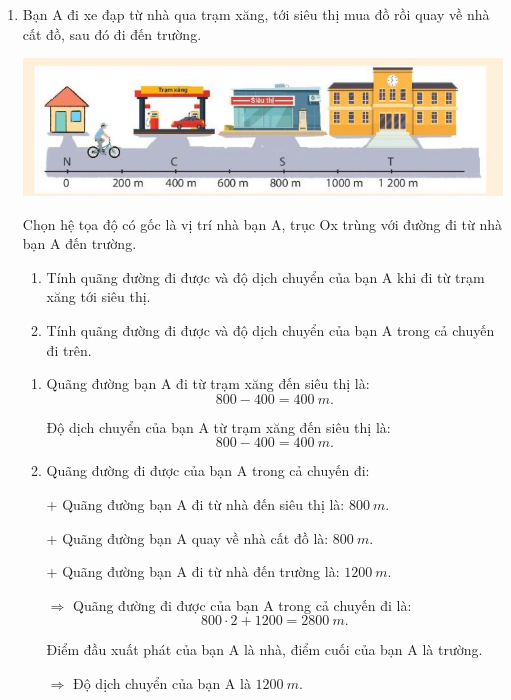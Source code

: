 \begin{enumerate}[label=\bfseries Bài \arabic*:,leftmargin=1.5cm]
	\item {}
	
	
	{
		Bạn A đi xe đạp từ nhà qua trạm xăng, tới siêu thị mua đồ rồi quay về nhà cất đồ, sau đó đi đến trường. 
		
		\begin{center}
			\includegraphics[scale=1]{../figs/VN10-2022-PH-TP004-4.jpg}
		\end{center}
		Chọn hệ tọa độ có gốc là vị trí nhà bạn A, trục Ox trùng với đường đi từ nhà bạn A đến trường. 
		\begin{enumerate}[label=\alph*)]
			\item Tính quãng đường đi được và độ dịch chuyển của bạn A khi đi từ trạm xăng tới siêu thị.
			\item Tính quãng đường đi được và độ dịch chuyển của bạn A trong cả chuyến đi trên.
		\end{enumerate}
	}
	
	\hideall
	{	
		\begin{enumerate}[label=\alph*)]
			\item Quãng đường bạn A đi từ trạm xăng đến siêu thị là: $$800 - 400 = \SI{400}{m}.$$
			
			Độ dịch chuyển của bạn A từ trạm xăng đến siêu thị là: $$800 - 400 = \SI{400}{m}.$$
			
			\item 
			Quãng đường đi được của bạn A trong cả chuyến đi:
			
			+ Quãng đường bạn A đi từ nhà đến siêu thị là: $\SI{800}{m}.$
			
			+ Quãng đường bạn A quay về nhà cất đồ là: $\SI{800}{m}.$
			
			+ Quãng đường bạn A đi từ nhà đến trường là: $\SI{1200}{m}.$
			
			$\Rightarrow$ Quãng đường đi được của bạn A trong cả chuyến đi là: 	$$ 800 \cdot 2 + 1200 = \SI{2800}{m}.$$ 
			
			Điểm đầu xuất phát của bạn A là nhà, điểm cuối của bạn A là trường.
			
			$\Rightarrow$ Độ dịch chuyển của bạn A là $\SI{1200}{m}.$
			

\end{enumerate}}
\end{enumerate}
